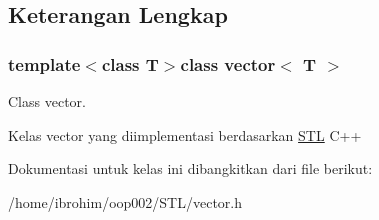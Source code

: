 \subsection{Keterangan Lengkap}
\subsubsection*{template$<$class T$>$class vector$<$ T $>$}

Class vector. 

Kelas vector yang diimplementasi berdasarkan \hyperlink{namespaceSTL}{S\+T\+L} C++ 

Dokumentasi untuk kelas ini dibangkitkan dari file berikut\+:\begin{DoxyCompactItemize}
\item 
/home/ibrohim/oop002/\+S\+T\+L/vector.\+h\end{DoxyCompactItemize}
